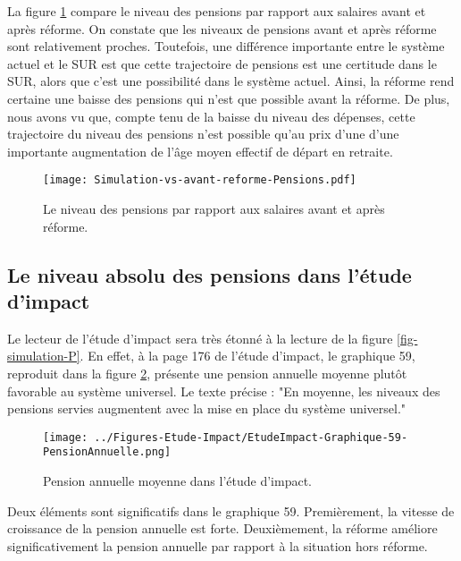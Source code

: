 \documentclass[10pt]{article}
\begin{document}
La figure \ref{fig-simulation-P-vs-COR} compare le niveau des pensions par rapport 
aux salaires avant et après réforme. 
On constate que les niveaux de pensions avant et après réforme sont 
relativement proches. 
Toutefois, une différence importante entre le système actuel 
et le SUR est que cette trajectoire de pensions est une certitude dans le SUR, 
alors que c'est une possibilité dans le système actuel. 
Ainsi, la réforme rend certaine une baisse des pensions qui n'est que 
possible avant la réforme. 
De plus, nous avons vu que, compte tenu de la baisse du niveau des dépenses, 
cette trajectoire du niveau des pensions n'est possible qu'au prix d'une 
d'une importante augmentation de l'âge moyen effectif de départ en retraite. 

\begin{figure}
\begin{center}
\texttt{[image: Simulation-vs-avant-reforme-Pensions.pdf]}
\end{center}
\caption{Le niveau des pensions par rapport aux salaires 
avant et après réforme.}
\label{fig-simulation-P-vs-COR}
\end{figure}


\subsection{Le niveau absolu des pensions dans l'étude d'impact}

Le lecteur de l'étude d'impact sera très étonné à la lecture de la figure 
\ref{fig-simulation-P}. 
En effet, à la page 176 de l'étude d'impact, le graphique 59, 
reproduit dans la figure \ref{fig-pension-annuelle-etude-impact}, 
présente une pension annuelle moyenne plutôt favorable au système 
universel.
Le texte précise : "En moyenne, les niveaux des pensions servies augmentent 
avec la mise en place du système universel."

\begin{figure}
\begin{center}
\texttt{[image: ../Figures-Etude-Impact/EtudeImpact-Graphique-59-PensionAnnuelle.png]}
\end{center}

\caption{Pension annuelle moyenne dans l'étude d'impact.}
\label{fig-pension-annuelle-etude-impact}
\end{figure}

Deux éléments sont significatifs dans le graphique 59. 
Premièrement, la vitesse de croissance de la pension annuelle est forte. 
Deuxièmement, la réforme améliore significativement la pension annuelle 
par rapport à la situation hors réforme. 
\end{document}
